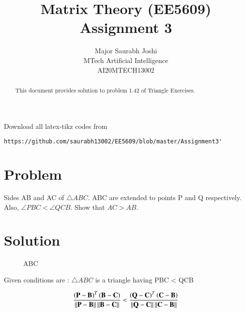 \documentclass[journal,12pt,twocolumn]{IEEEtran}
\begin{document}
\makeatletter
{}
\makeatother
\let\StandardTheFigure\thefigure
\let\vec\mathbf
\renewcommand{\thefigure}{\theproblem}
\def\putbox#1#2#3{\makebox[0in][l]{\makebox[#1][l]{}\raisebox{\baselineskip}[0in][0in]{\raisebox{#2}[0in][0in]{#3}}}}
     \def\rightbox#1{\makebox[0in][r]{#1}}
     \def\centbox#1{\makebox[0in]{#1}}
     \def\topbox#1{\raisebox{-\baselineskip}[0in][0in]{#1}}
     \def\midbox#1{\raisebox{-0.5\baselineskip}[0in][0in]{#1}}
\vspace{3cm}
\title{Matrix Theory (EE5609) Assignment 3}
\author{Major Saurabh Joshi\\MTech Artificial Intelligence\\AI20MTECH13002}
\maketitle
\newpage
\bigskip
\renewcommand{\thefigure}{\theenumi}
\renewcommand{\thetable}{\theenumi}
\begin{abstract}
This  document provides solution to problem 1.42 of Triangle Exercises.
\end{abstract}
Download all latex-tikz codes from 
%
\begin{lstlisting}
https://github.com/saurabh13002/EE5609/blob/master/Assignment3'
\end{lstlisting}
%
\section{Problem}
Sides AB and AC of $\triangle{ABC}$. ABC are extended to points P and Q respectively.
Also, $\angle PBC < \angle QCB$. Show that $AC > AB$.
\section{ Solution}
\renewcommand{\thefigure}{1}
\begin{figure}[hb]
	\centering
	\centering
	\resizebox{\columnwidth}{!}{}
	\caption{\triangle ABC}
	\end{figure}
	
Given conditions are : $\triangle {ABC}$  is a triangle having \angle PBC < \angle QCB 

\begin{align}
\frac{\left( \vec{P - B} \right)^T  \left( \vec{B - C } \right)}{\norm{\vec{ P - B}} \norm{\vec{B - C}}}<\frac{\left( \vec{ Q - C} \right)^T  \left( \vec{C - B} \right)}{\norm{\vec{ Q - C}} \norm{\vec{C - B}}}
\end{align}
\end{document}
